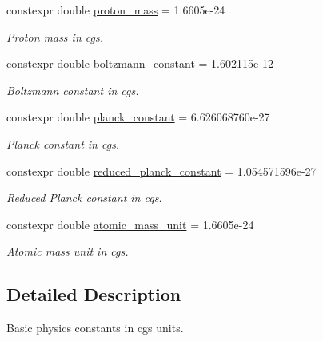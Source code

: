 \begin{DoxyCompactItemize}
constexpr double \hyperlink{namespaceraytracer_1_1physics_1_1constants_a5783938c1c16153b5f777e08bd62641f}{proton\+\_\+mass} = 1.\+6605e-\/24
\begin{DoxyCompactList}\small\item\em Proton mass in cgs. \end{DoxyCompactList}\item 
\mbox{\label{namespaceraytracer_1_1physics_1_1constants_af2e25a60a8ec90d2aecc015dac72b525}} 
constexpr double \hyperlink{namespaceraytracer_1_1physics_1_1constants_af2e25a60a8ec90d2aecc015dac72b525}{boltzmann\+\_\+constant} = 1.\+602115e-\/12
\begin{DoxyCompactList}\small\item\em Boltzmann constant in cgs. \end{DoxyCompactList}\item 
\mbox{\label{namespaceraytracer_1_1physics_1_1constants_a35360b52401efbd300043ac28a05bdbd}} 
constexpr double \hyperlink{namespaceraytracer_1_1physics_1_1constants_a35360b52401efbd300043ac28a05bdbd}{planck\+\_\+constant} = 6.\+626068760e-\/27
\begin{DoxyCompactList}\small\item\em Planck constant in cgs. \end{DoxyCompactList}\item 
\mbox{\label{namespaceraytracer_1_1physics_1_1constants_a74738f19c1d70dd3e163bc61a16b338a}} 
constexpr double \hyperlink{namespaceraytracer_1_1physics_1_1constants_a74738f19c1d70dd3e163bc61a16b338a}{reduced\+\_\+planck\+\_\+constant} = 1.\+054571596e-\/27
\begin{DoxyCompactList}\small\item\em Reduced Planck constant in cgs. \end{DoxyCompactList}\item 
\mbox{\label{namespaceraytracer_1_1physics_1_1constants_a559245919a460ef36168f7c60f435be0}} 
constexpr double \hyperlink{namespaceraytracer_1_1physics_1_1constants_a559245919a460ef36168f7c60f435be0}{atomic\+\_\+mass\+\_\+unit} = 1.\+6605e-\/24
\begin{DoxyCompactList}\small\item\em Atomic mass unit in cgs. \end{DoxyCompactList}\end{DoxyCompactItemize}


\subsection{Detailed Description}
Basic physics constants in cgs units. 